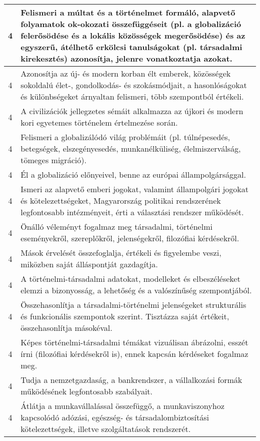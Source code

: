 \begin{longtable}{c | p{} }
                                
                                          4 &  Felismeri a múltat és a történelmet formáló, alapvető folyamatok ok-okozati összefüggéseit (pl. a globalizáció felerősödése és a lokális közösségek megerősödése) és az egyszerű, átélhető erkölcsi tanulságokat (pl. társadalmi kirekesztés) azonosítja, jelenre vonatkoztatja azokat. \\ \hline
                                          4 &  Azonosítja az új- és modern korban élt emberek, közösségek sokoldalú élet-, gondolkodás- és szokásmódjait, a hasonlóságokat és különbségeket árnyaltan felismeri, több szempontból értékeli. \\ \hline
                                          4 &  A civilizációk jellegzetes sémáit alkalmazza az újkori és modern kori egyetemes történelem értelmezése során. \\ \hline
                                          4 &  Felismeri a globalizálódó világ problémáit (pl. túlnépesedés, betegségek, elszegényesedés, munkanélküliség, élelmiszerválság, tömeges migráció). \\ \hline
                                          4 &  Él a globalizáció előnyeivel, benne az európai állampolgársággal. \\ \hline
                                          4 &  Ismeri az alapvető emberi jogokat, valamint állampolgári jogokat és kötelezettségeket, Magyarország politikai rendszerének legfontosabb intézményeit, érti a választási rendszer működését. \\ \hline
                                          4 &  Önálló véleményt fogalmaz meg társadalmi, történelmi eseményekről, szereplőkről, jelenségekről, filozófiai kérdésekről. \\ \hline
                                          4 &  Mások érvelését összefoglalja, értékeli és figyelembe veszi, miközben saját álláspontját gazdagítja. \\ \hline
                                          4 &  A történelmi-társadalmi adatokat, modelleket és elbeszéléseket elemzi a bizonyosság, a lehetőség és a valószínűség szempontjából. \\ \hline
                                          4 &  Összehasonlítja a társadalmi-történelmi jelenségeket strukturális és funkcionális szempontok szerint. Tisztázza saját értékeit, összehasonlítja másokéval. \\ \hline
                                          4 &  Képes történelmi-társadalmi témákat vizuálisan ábrázolni, esszét írni (filozófiai kérdésekről is), ennek kapcsán kérdéseket fogalmaz meg. \\ \hline
                                          4 &  Tudja a nemzetgazdaság, a bankrendszer, a vállalkozási formák működésének legfontosabb szabályait. \\ \hline
                                          4 &  Átlátja a munkavállalással összefüggő, a munkaviszonyhoz kapcsolódó adózási, egészség- és társadalombiztosítási kötelezettségek, illetve szolgáltatások rendszerét. \\ \hline
                                      
                        \end{longtable}
